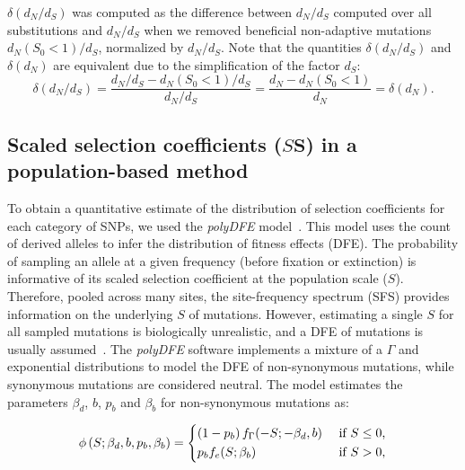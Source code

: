 \documentclass[10pt,letterpaper]{article}
\newcommand{\dn}{d_N}
\newcommand{\ds}{d_S}
\newcommand{\dnds}{\dn / \ds}
\newcommand{\Sphy}{S_{0}}
\newcommand{\Spop}{S}
\newcommand{\AdvMean}{\beta_b}
\newcommand{\DelMean}{\beta_d}
\providecommand{\DIFdeltex}[1]{{\protect\color{red}\sout{#1}}}                      %
\providecommand{\DIFaddbegin}{} %
\providecommand{\DIFaddend}{} %
\providecommand{\DIFdelbegin}{} %
\providecommand{\DIFdelend}{} %
\providecommand{\DIFdel}[1]{\texorpdfstring{\DIFdeltex{#1}}{}} %
\newcommand{\DIFscaledelfig}{0.5}
\newlength{\DIFdelgraphicswidth} %
\newlength{\DIFdelgraphicsheight} %
\newcommand{\DIFaddincludegraphics}[2][]{{\color{blue}\fbox{\DIFOincludegraphics[#1]{#2}}}} %
\newcommand{\DIFdelincludegraphics}[2][]{%
\sbox{\DIFdelgraphicsbox}{\DIFOincludegraphics[#1]{#2}}%
\settoboxwidth{\DIFdelgraphicswidth}{\DIFdelgraphicsbox} %
\settoboxtotalheight{\DIFdelgraphicsheight}{\DIFdelgraphicsbox} %
\scalebox{\DIFscaledelfig}{%
\parbox[b]{\DIFdelgraphicswidth}{\usebox{\DIFdelgraphicsbox}\\[-\baselineskip] \rule{\DIFdelgraphicswidth}{0em}}\llap{\resizebox{\DIFdelgraphicswidth}{\DIFdelgraphicsheight}{%
\setlength{\unitlength}{\DIFdelgraphicswidth}%
\begin{picture}(1,1)%
\thicklines\linethickness{2pt} %
{\color[rgb]{1,0,0}\put(0,0){\framebox(1,1){}}}%
{\color[rgb]{1,0,0}\put(0,0){\line( 1,1){1}}}%
{\color[rgb]{1,0,0}\put(0,1){\line(1,-1){1}}}%
\end{picture}%
}\hspace*{3pt}}} %
} %
\DeclareRobustCommand{\DIFaddbegin}{\DIFOaddbegin \let\includegraphics\DIFaddincludegraphics} %
\DeclareRobustCommand{\DIFaddend}{\DIFOaddend \let\includegraphics\DIFOincludegraphics} %
\DeclareRobustCommand{\DIFdelbegin}{\DIFOdelbegin \let\includegraphics\DIFdelincludegraphics} %
\DeclareRobustCommand{\DIFdelend}{\DIFOaddend \let\includegraphics\DIFOincludegraphics} %
\begin{document}
$\delta(\dnds)$ was computed as the difference between $\dnds$ computed over all substitutions and $\dnds$ when we removed beneficial non-adaptive mutations $\dn (\Sphy < 1) / \ds$, normalized by $\dnds$.
Note that the quantities $\delta(\dnds)$ and $\delta(\dn)$ are equivalent due to the simplification of the factor $\ds$:
\begin{equation}
\delta(\dnds) = \dfrac{\dnds - \dn(\Sphy < 1) / \ds}{\dnds} = \dfrac{\dn - \dn(\Sphy < 1)}{\dn} = \delta(\dn).\label{eq:delta-dnds}
\end{equation}

\subsection{Scaled selection coefficients (\DIFdelbegin \DIFdel{$\Spop$}\DIFdelend \DIFaddbegin \texorpdfstring{$\bm{\Spop}$}{S}\DIFaddend ) in a population-based method}
\label{subsec:s-polymorphism-method}

To obtain a quantitative estimate of the distribution of selection coefficients for each category of SNPs, we used the \textit{polyDFE} model~\cite{tataru_inference_2017, tataru_polydfe_2020}.
This model uses the count of derived alleles to infer the distribution of fitness effects (DFE).
The probability of sampling an allele at a given frequency (before fixation or extinction) is informative of its scaled selection coefficient at the population scale ($\Spop$).
Therefore, pooled across many sites, the site-frequency spectrum (SFS) provides information on the underlying $\Spop$ of mutations.
However, estimating a single $\Spop$ for all sampled mutations is biologically unrealistic, and a DFE of mutations is usually assumed~\cite{eyre-walker_distribution_2006, eyre-walker_estimating_2009}.
The \textit{polyDFE}\cite{tataru_inference_2017, tataru_polydfe_2020} software implements a mixture of a $\Gamma$ and exponential distributions to model the DFE of non-synonymous mutations, while synonymous mutations are considered neutral.
The model estimates the parameters $\DelMean$, $b$, $p_b$ and $\AdvMean$ for non-synonymous mutations as:

\begin{equation}
\label{eq:parametric-dfe}
\phi \left( \Spop; \DelMean , b, p_b, \AdvMean \right) =
\begin{dcases}
\left( 1 - p_b \right) f_{\Gamma}(-\Spop; -\DelMean, b) & \text{ if $\Spop \leq 0$,} \\
p_b f_{e}(\Spop; \AdvMean) & \text{ if $\Spop > 0$,} \\
\end{dcases}
\end{equation}
\end{document}
